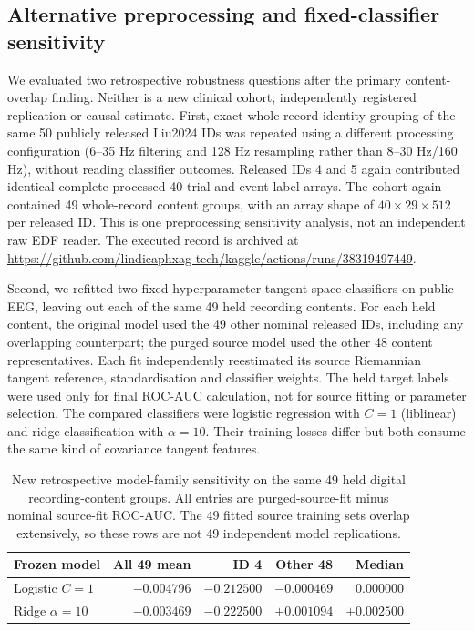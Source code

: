 \subsection{Alternative preprocessing and fixed-classifier sensitivity}
\label{sec:p2-real-extra-robustness}
We evaluated two retrospective robustness questions after the
primary content-overlap finding. Neither is a new clinical
cohort, independently registered replication or causal
estimate. First, exact whole-record identity grouping
of the same 50 publicly released Liu2024 IDs was
repeated using a different processing configuration
(6--35 Hz filtering and 128 Hz resampling rather
than 8--30 Hz/160 Hz), without reading classifier
outcomes. Released IDs 4 and 5 again contributed
identical complete processed 40-trial and event-label
arrays. The cohort again contained 49 whole-record
content groups, with an array shape of
$40\times29\times512$ per released ID.
This is one preprocessing sensitivity analysis,
not an independent raw EDF reader.
The executed record is archived at
\url{https://github.com/lindicaphxag-tech/kaggle/actions/runs/38319497449}.

Second, we refitted two fixed-hyperparameter
tangent-space classifiers on public EEG, leaving
out each of the same 49 held recording contents.
For each held content, the original model used
the 49 other nominal released IDs, including
any overlapping counterpart; the purged source
model used the other 48 content representatives.
Each fit independently reestimated its source
Riemannian tangent reference, standardisation
and classifier weights. The held target labels
were used only for final ROC-AUC calculation,
not for source fitting or parameter selection.
The compared classifiers were logistic regression
with $C=1$ (liblinear) and ridge classification
with $\alpha=10$. Their training losses differ
but both consume the same kind of covariance
tangent features.

\begin{table}[tb]
\centering\small
\caption{New retrospective model-family sensitivity
on the same 49 held digital recording-content groups.
All entries are purged-source-fit minus nominal
source-fit ROC-AUC. The 49 fitted source training
sets overlap extensively, so these rows are
not 49 independent model replications.}
\label{tab:p2-multimodel}
\setlength{\tabcolsep}{4pt}
\begin{tabular}{p{.31\linewidth}rrrr}
\toprule
Frozen model & All 49 mean & ID 4 & Other 48 & Median \\
\midrule
Logistic $C=1$
& $-0.004796$ & $-0.212500$ & $-0.000469$ & $0.000000$\\
Ridge $\alpha=10$
& $-0.003469$ & $-0.222500$ & $+0.001094$ & $+0.002500$\\
\bottomrule
\end{tabular}
\end{table}


